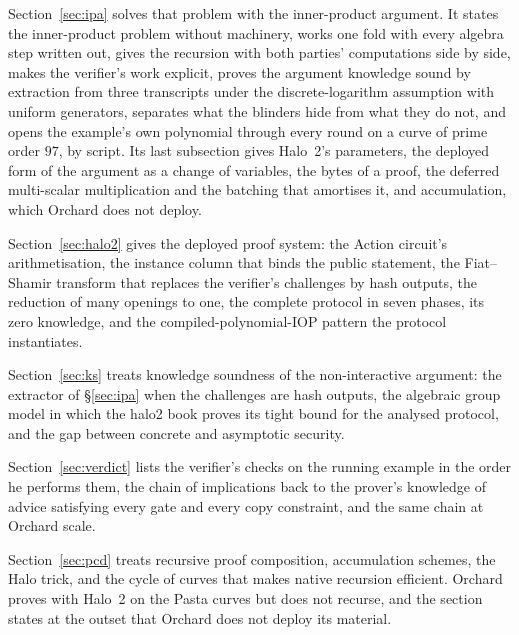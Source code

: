 \documentclass[11pt,a4paper]{article}
\theoremstyle{definition}
\begin{document}
Section~\ref{sec:ipa} solves that problem with the inner-product argument. It
states the inner-product problem without machinery, works one fold with every
algebra step written out, gives the recursion with both parties' computations
side by side, makes the verifier's work explicit, proves the argument knowledge
sound by extraction from three transcripts under the discrete-logarithm
assumption with uniform generators, separates what the blinders hide from what
they do not, and opens the example's own polynomial through every round on a
curve of prime order $97$, by script. Its last subsection gives Halo~2's
parameters, the deployed form of the argument as a change of variables, the
bytes of a proof, the deferred multi-scalar multiplication and the batching that
amortises it, and accumulation, which Orchard does not deploy.

Section~\ref{sec:halo2} gives the deployed proof system: the Action
circuit's arithmetisation, the instance column that binds the public
statement, the Fiat--Shamir transform that replaces the verifier's
challenges by hash outputs, the reduction of many openings to one, the
complete protocol in seven phases, its zero knowledge, and the
compiled-polynomial-IOP pattern the protocol instantiates.

Section~\ref{sec:ks} treats knowledge soundness of the non-interactive
argument: the extractor of \S\ref{sec:ipa} when the challenges are hash
outputs, the algebraic group model in which the halo2 book proves its
tight bound for the analysed protocol, and the gap between concrete and
asymptotic security.

Section~\ref{sec:verdict} lists the verifier's checks on the running
example in the order he performs them, the chain of implications back
to the prover's knowledge of advice satisfying every gate and every copy
constraint, and the same chain at Orchard scale.

Section~\ref{sec:pcd} treats recursive proof composition, accumulation
schemes, the Halo trick, and the cycle of curves that makes native
recursion efficient. Orchard proves with Halo~2 on the Pasta curves but
does not recurse, and the section states at the outset that Orchard
does not deploy its material.
\end{document}
